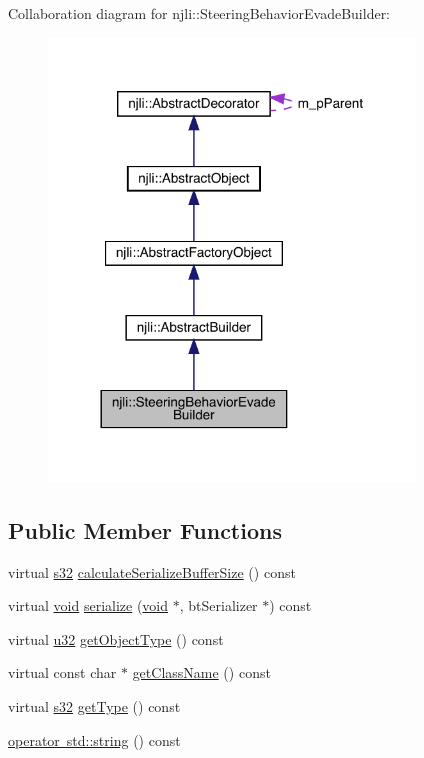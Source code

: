 Collaboration diagram for njli\+:\+:Steering\+Behavior\+Evade\+Builder\+:\nopagebreak
\begin{figure}[H]
\begin{center}
\leavevmode
\includegraphics[width=276pt]{classnjli_1_1_steering_behavior_evade_builder__coll__graph}
\end{center}
\end{figure}
\subsection*{Public Member Functions}
\begin{DoxyCompactItemize}
\item 
virtual \mbox{\hyperlink{_util_8h_aa62c75d314a0d1f37f79c4b73b2292e2}{s32}} \mbox{\hyperlink{classnjli_1_1_steering_behavior_evade_builder_a0681342ce2590a57b67953310bad92de}{calculate\+Serialize\+Buffer\+Size}} () const
\item 
virtual \mbox{\hyperlink{_thread_8h_af1e856da2e658414cb2456cb6f7ebc66}{void}} \mbox{\hyperlink{classnjli_1_1_steering_behavior_evade_builder_a340a9ed97c82909286f05fdcd05b3db7}{serialize}} (\mbox{\hyperlink{_thread_8h_af1e856da2e658414cb2456cb6f7ebc66}{void}} $\ast$, bt\+Serializer $\ast$) const
\item 
virtual \mbox{\hyperlink{_util_8h_a10e94b422ef0c20dcdec20d31a1f5049}{u32}} \mbox{\hyperlink{classnjli_1_1_steering_behavior_evade_builder_a38506bbad92150c615a3fbec153b1410}{get\+Object\+Type}} () const
\item 
virtual const char $\ast$ \mbox{\hyperlink{classnjli_1_1_steering_behavior_evade_builder_a4ebd083f8d91c528047c2a88e1f81e23}{get\+Class\+Name}} () const
\item 
virtual \mbox{\hyperlink{_util_8h_aa62c75d314a0d1f37f79c4b73b2292e2}{s32}} \mbox{\hyperlink{classnjli_1_1_steering_behavior_evade_builder_aae11d5b1325c0938ddb7f9b22572a48d}{get\+Type}} () const
\item 
\mbox{\hyperlink{classnjli_1_1_steering_behavior_evade_builder_a55598eb3fd729ed2d06ac1b07e9331ed}{operator std\+::string}} () const
\end{DoxyCompactItemize}
